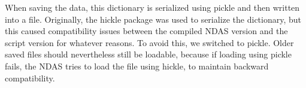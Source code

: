 When saving the data, this dictionary is serialized using pickle and then written into a file. Originally, the hickle package was used to serialize the dictionary, but this caused compatibility issues between the compiled NDAS version and the script version for whatever reasons. To avoid this, we switched to pickle. Older saved files should nevertheless still be loadable, because if loading using pickle fails, the NDAS tries to load the file using hickle, to maintain backward compatibility. 